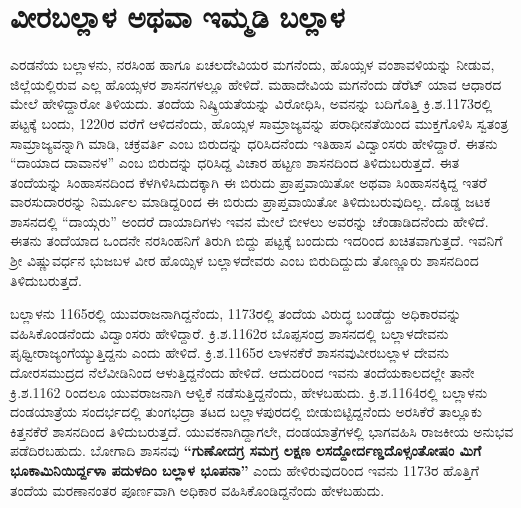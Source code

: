 \section{ವೀರಬಲ್ಲಾಳ ಅಥವಾ ಇಮ್ಮಡಿ ಬಲ್ಲಾಳ}

ಎರಡನೆಯ ಬಲ್ಲಾಳನು, ನರಸಿಂಹ ಹಾಗೂ ಏಚಲದೇವಿಯರ ಮಗನೆಂದು, ಹೊಯ್ಸಳ ವಂಶಾವಳಿಯನ್ನು ನೀಡುವ, ಜಿಲ್ಲೆಯಲ್ಲಿರುವ ಎಲ್ಲ ಹೊಯ್ಸಳರ ಶಾಸನಗಳಲ್ಲೂ ಹೇಳಿದೆ. ಮಹಾದೇವಿಯ ಮಗನೆಂದು ಡೆರೆಟ್​ ಯಾವ ಆಧಾರದ ಮೇಲೆ ಹೇಳಿದ್ದಾರೋ ತಿಳಿಯದು. ತಂದೆಯ ನಿಷ್ಕ್ರಿಯತೆಯನ್ನು ವಿರೋಧಿಸಿ, ಅವನನ್ನು ಬದಿಗೊತ್ತಿ ಕ್ರಿ.ಶ.1173ರಲ್ಲಿ ಪಟ್ಟಕ್ಕೆ ಬಂದು, 1220ರ ವರೆಗೆ ಆಳಿದನೆಂದು, ಹೊಯ್ಸಳ ಸಾಮ್ರಾಜ್ಯವನ್ನು ಪರಾಧೀನತೆಯಿಂದ ಮುಕ್ತಗೊಳಿಸಿ ಸ್ವತಂತ್ರ ಸಾಮ್ರಾಜ್ಯವನ್ನಾಗಿ ಮಾಡಿ, ಚಕ್ರವರ್ತಿ ಎಂಬ ಬಿರುದನ್ನು ಧರಿಸಿದನೆಂದು ಇತಿಹಾಸ ವಿದ್ವಾಂಸರು ಹೇಳಿದ್ದಾರೆ. ಈತನು “ದಾಯಾದ ದಾವಾನಳ” ಎಂಬ ಬಿರುದನ್ನು ಧರಿಸಿದ್ದ ವಿಚಾರ ಹಟ್ಟಣ ಶಾಸನದಿಂದ ತಿಳಿದುಬರುತ್ತದೆ.  ಈತ ತಂದೆಯನ್ನು ಸಿಂಹಾಸನದಿಂದ ಕೆಳಗಿಳಿಸಿದುದಕ್ಕಾಗಿ ಈ ಬಿರುದು ಪ್ರಾಪ್ತವಾಯಿತೋ ಅಥವಾ ಸಿಂಹಾಸನಕ್ಕಿದ್ದ ಇತರೆ ವಾರಸುದಾರರನ್ನು ನಿರ್ಮೂಲ ಮಾಡಿದ್ದರಿಂದ ಈ ಬಿರುದು ಪ್ರಾಪ್ತವಾಯಿತೋ ತಿಳಿದುಬರುವುದಿಲ್ಲ. ದೊಡ್ಡ ಜಟಕ ಶಾಸನದಲ್ಲಿ “ದಾಯ್ಗರು” ಅಂದರೆ ದಾಯಾದಿಗಳು ಇವನ ಮೇಲೆ ಬೀಳಲು ಅವರನ್ನು ಚೆಂಡಾಡಿದನೆಂದು ಹೇಳಿದೆ. ಈತನು ತಂದೆಯಾದ ಒಂದನೇ ನರಸಿಂಹನಿಗೆ ತಿರುಗಿ ಬಿದ್ದು ಪಟ್ಟಕ್ಕೆ ಬಂದುದು ಇದರಿಂದ ಖಚಿತವಾಗುತ್ತದೆ. ಇವನಿಗೆ ಶ‍್ರೀ ವಿಷ್ಣುವರ್ಧನ ಭುಜಬಳ ವೀರ ಹೊಯ್ಸಿಳ ಬಲ್ಲಾಳದೇವರು ಎಂಬ ಬಿರುದಿದ್ದುದು ತೊಣ್ಣೂರು ಶಾಸನದಿಂದ ತಿಳಿದುಬರುತ್ತದೆ. 

ಬಲ್ಲಾಳನು 1165ರಲ್ಲಿ ಯುವರಾಜನಾಗಿದ್ದನೆಂದು, 1173ರಲ್ಲಿ ತಂದೆಯ ವಿರುದ್ಧ ಬಂಡೆದ್ದು ಅಧಿಕಾರವನ್ನು ವಹಿಸಿಕೊಂಡ\-ನೆಂದು ವಿದ್ವಾಂಸರು ಹೇಳಿದ್ದಾರೆ. ಕ್ರಿ.ಶ.1162ರ ಬೊಪ್ಪಸಂದ್ರ ಶಾಸನದಲ್ಲಿ ಬಲ್ಲಾಳದೇವನು ಪೃಥ್ವೀರಾಜ್ಯಂಗೆಯ್ಯುತ್ತಿದ್ದನು ಎಂದು ಹೇಳಿದೆ.  ಕ್ರಿ.ಶ.1165ರ ಲಾಳನಕೆರೆ ಶಾಸನವುವೀರಬಲ್ಲಾಳ ದೇವನು ದೋರಸಮುದ್ರದ ನೆಲೆವೀಡಿನಿಂದ ಆಳುತ್ತಿದ್ದನೆಂದು ಹೇಳಿದೆ. ಆದುದರಿಂದ ಇವನು ತಂದೆಯಕಾಲದಲ್ಲೇ ತಾನೇ ಕ್ರಿ.ಶ.1162 ರಿಂದಲೂ ಯುವರಾಜನಾಗಿ ಆಳ್ವಿಕೆ ನಡೆಸುತ್ತಿದ್ದನೆಂದು, ಹೇಳಬಹುದು. ಕ್ರಿ.ಶ.1164ರಲ್ಲಿ ಬಲ್ಲಾಳನು ದಂಡಯಾತ್ರೆಯ ಸಂದರ್ಭದಲ್ಲಿ ತುಂಗಭದ್ರಾ ತಟದ ಬಲ್ಲಾಳಪುರದಲ್ಲಿ ಬೀಡುಬಿಟ್ಟಿದ್ದನೆಂದು ಅರಸಿಕೆರೆ ತಾಲ್ಲೂಕು ಕಿತ್ತನಕೆರೆ ಶಾಸನದಿಂದ ತಿಳಿದುಬರುತ್ತದೆ. ಯುವಕನಾಗಿದ್ದಾಗಲೇ, ದಂಡಯಾತ್ರೆಗಳಲ್ಲಿ ಭಾಗವಹಿಸಿ ರಾಜಕೀಯ ಅನುಭವ ಪಡೆದಿರಬಹುದು. ಬೋಗಾದಿ ಶಾಸನವು \textbf{“ಗುಣೋದಗ್ರ ಸಮಗ್ರ ಲಕ್ಷಣ ಲಸದ್ದೋರ್ದಣ್ಡದೊಳ್ಸಂತೋಷಂ ಮಿಗೆ ಭೂಕಾಮಿನಿಯಿರ್ದ್ದಳಾ ಪದುಳದಿಂ ಬಲ್ಲಾಳ ಭೂಪನಾ”} ಎಂದು ಹೇಳಿರುವುದರಿಂದ ಇವನು 1173ರ ಹೊತ್ತಿಗೆ ತಂದೆಯ ಮರಣಾನಂತರ ಪೂರ್ಣವಾಗಿ ಅಧಿಕಾರ ವಹಿಸಿಕೊಂಡಿದ್ದನೆಂದು ಹೇಳಬಹುದು.

